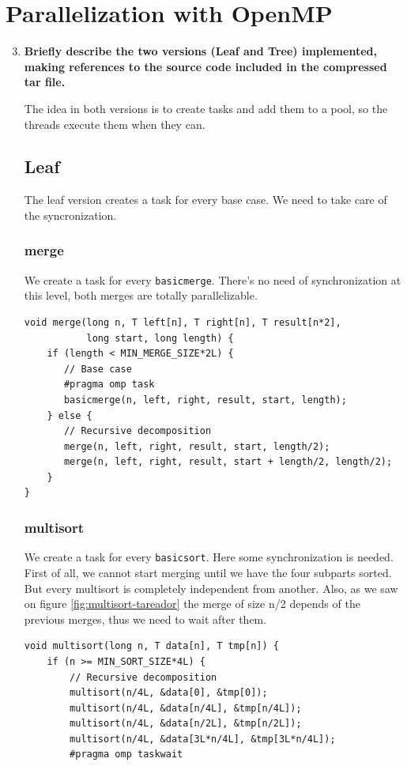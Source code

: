 \documentclass[a4paper,11pt]{article}
\begin{document}
\section{Parallelization with OpenMP}
\begin{enumerate}
  \setcounter{enumi}{2}
  \item
    \textbf{Briefly describe the two versions (Leaf and Tree)
      implemented, making references to the source code included in
      the compressed tar file.}

    The idea in both versions is to create tasks and add them to a pool,
    so the threads execute them when they can.

\subsection{Leaf}
The leaf version creates a task for every base case. We need to
take care of the syncronization.

\subsubsection{merge}
We create a task for every {\tt basicmerge}. There's no need of
synchronization at this level, both merges are totally parallelizable.

\begin{verbatim}
void merge(long n, T left[n], T right[n], T result[n*2],
           long start, long length) {
    if (length < MIN_MERGE_SIZE*2L) {
       // Base case
       #pragma omp task
       basicmerge(n, left, right, result, start, length);
    } else {
       // Recursive decomposition
       merge(n, left, right, result, start, length/2);
       merge(n, left, right, result, start + length/2, length/2);
    }
}
\end{verbatim}

\subsubsection{multisort}
We create a task for every {\tt basicsort}. Here some synchronization is needed.
First of all, we cannot start merging until we have the four subparts sorted.
But every multisort is completely independent from another. Also, as we saw on figure
\ref{fig:multisort-tareador} the merge of size n/2 depends of the previous merges, thus
we need to wait after them.

\begin{verbatim}
void multisort(long n, T data[n], T tmp[n]) {
    if (n >= MIN_SORT_SIZE*4L) {
        // Recursive decomposition
        multisort(n/4L, &data[0], &tmp[0]);
        multisort(n/4L, &data[n/4L], &tmp[n/4L]);
        multisort(n/4L, &data[n/2L], &tmp[n/2L]);
        multisort(n/4L, &data[3L*n/4L], &tmp[3L*n/4L]);
        #pragma omp taskwait


\end{verbatim}
\end{enumerate}
\end{document}
